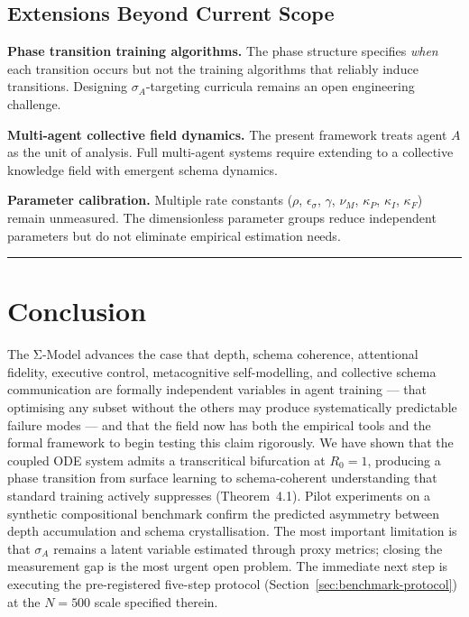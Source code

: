 \documentclass[11pt,a4paper]{article}
\begin{document}
\subsection{Extensions Beyond Current Scope}\label{sec:extensions}

\textbf{Phase transition training algorithms.} The phase structure
specifies \emph{when} each transition occurs but not the training
algorithms that reliably induce transitions. Designing $\sigma_A$-targeting
curricula remains an open engineering challenge.

\textbf{Multi-agent collective field dynamics.} The present framework
treats agent $A$ as the unit of analysis. Full multi-agent systems
require extending to a collective knowledge field with emergent schema
dynamics.

\textbf{Parameter calibration.} Multiple rate constants ($\rho$,
$\epsilon_\sigma$, $\gamma$, $\nu_M$, $\kappa_P$, $\kappa_I$, $\kappa_F$)
remain unmeasured. The dimensionless parameter groups reduce independent
parameters but do not eliminate empirical estimation needs.

\noindent\rule{\linewidth}{0.4pt}

\section{Conclusion}\label{sec:conclusion}

The Σ-Model advances the case that depth, schema coherence,
attentional fidelity, executive control, metacognitive self-modelling,
and collective schema communication are formally independent variables
in agent training --- that optimising any subset without the others
may produce systematically predictable failure modes --- and that the field
now has both the empirical tools and the formal framework to begin testing this
claim rigorously. We have shown that the coupled ODE system admits a transcritical bifurcation at $R_0 = 1$, producing a phase transition from surface learning to schema-coherent understanding that standard training actively suppresses (Theorem~4.1). Pilot experiments on a synthetic compositional benchmark confirm the predicted asymmetry between depth accumulation and schema crystallisation. The most important limitation is that $\sigma_A$ remains a latent variable estimated through proxy metrics; closing the measurement gap is the most urgent open problem. The immediate next step is executing the pre-registered five-step protocol (Section~\ref{sec:benchmark-protocol}) at the $N = 500$ scale specified therein.
\end{document}

